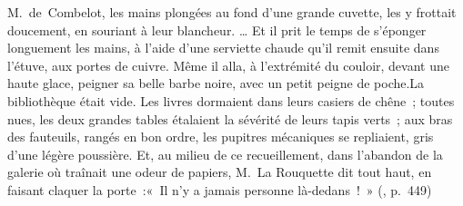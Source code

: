 \documentclass[11pt,twoside,openany]{book}
\newenvironment{lateiDocument}{}{}
\begin{document}
\begin{lateiDocument}
\begin{teiElement}[name={TEI},change={commons\_edition}]
\begin{teiElement}[name={text},type={book},xmlid={book}]
\begin{teiElement}[name={group},type={book},xmlid={book-001}]
\begin{teiElement}[name={group},type={section1},xmlid={section1-001}]
\begin{teiElement}
\begin{teiElement}[name={body},xmlid={body-005}]
\begin{teiDiv}[type={section1},xmlid={div02-4}]
\begin{teiCit}[xmlid={cit06-3}]
                \begin{teiQuote}
M. de Combelot, les mains plongées au fond d’une grande cuvette, les y frottait doucement, en souriant à leur blancheur. \lbrack{}…\rbrack{} Et il prit le temps de s’éponger longuement les mains, à l’aide d’une serviette chaude qu’il remit ensuite dans l’étuve, aux portes de cuivre. Même il alla, à l’extrémité du couloir, devant une haute glace, peigner sa belle barbe noire, avec un petit peigne de poche.\teiLb{}La bibliothèque était vide. Les livres dormaient dans leurs casiers de chêne ; toutes nues, les deux grandes tables étalaient la sévérité de leurs tapis verts ; aux bras des fauteuils, rangés en bon ordre, les pupitres mécaniques se repliaient, gris d’une légère poussière. Et, au milieu de ce recueillement, dans l’abandon de la galerie où traînait une odeur de papiers, M. La Rouquette dit tout haut, en faisant claquer la porte :\teiLb{}« Il n’y a jamais personne là-dedans ! » (, p. 449)
\end{teiQuote}
              

\end{teiCit}
\end{teiDiv}
\end{teiElement}
\end{teiElement}
\end{teiElement}
\end{teiElement}
\end{teiElement}
\end{teiElement}
\end{lateiDocument}
\end{document}
